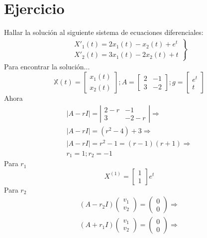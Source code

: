 \documentclass[12pt,spanish,lettersize,twocolumn]{article}
\begin{document}
\section{Ejercicio}
Hallar la soluci\'on al siguiente sistema de ecuaciones diferenciales:\\
\begin{eqnarray}
\left.
\begin{array}{l}
X'_1(t)=2x_1(t)-x_2(t)+e^t\\
X'_2(t)=3x_1(t)-2x_2(t)+t
\end{array}
\right\rbrace
\end{eqnarray}
Para encontrar la soluci\'on...\\
\begin{equation*}
\mathbb{X}(t)=\left[
\begin{array}{c}
x_1(t)\\
x_2(t)
\end{array}
\right]; A=\left[
\begin{array}{rr}
2 & -1\\
3 & -2
\end{array}
\right]; g=\left[
\begin{array}{c}
e^t\\
t
\end{array}
\right]
\end{equation*}
Ahora\\
\begin{eqnarray}
\left|A-rI\right|=\left|\begin{array}{cc}
2-r & -1\\
3 & -2-r
\end{array}
\right|\Rightarrow\\
\nonumber |A-rI|=(r^2-4)+3\Rightarrow\\
\nonumber |A-rI|=r^2-1=(r-1)(r+1)\Rightarrow\\
r_1=1;r_2=-1
\end{eqnarray}
Para $r_1$\\
\begin{equation}
X^{(1)}=\left[\begin{array}{c}
1\\
1
\end{array}\right]e^t
\end{equation}
Para $r_2$\\
\begin{eqnarray}
(A-r_2I)\left(
\begin{array}{c}
v_1\\
v_2
\end{array}
\right)=\left(
\begin{array}{c}
0\\
0
\end{array}
\right)\Rightarrow\\
\nonumber(A+r_1I)\left(
\begin{array}{c}
v_1\\
v_2
\end{array}
\right)=\left(
\begin{array}{c}
0\\
0
\end{array}
\right)\Rightarrow
\end{eqnarray}
\end{document}
